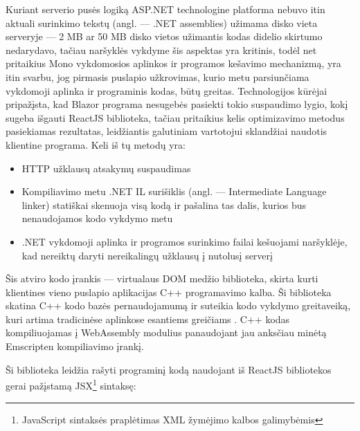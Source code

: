 \documentclass{VUMIFPSkursinis}
\begin{document}
Kuriant serverio pusės logiką ASP.NET technologine platforma nebuvo itin aktuali surinkimo tekstų (angl. — .NET assemblies) užimama disko vieta serveryje — 2 MB ar 50 MB disko vietos užimantis kodas didelio skirtumo nedarydavo, tačiau naršyklės vykdyme šis aspektas yra kritinis, todėl net pritaikius Mono vykdomosios aplinkos ir programos kešavimo mechanizmą, yra itin svarbu, jog pirmasis puslapio užkrovimas, kurio metu parsiunčiama vykdomoji aplinka ir programinis kodas, būtų greitas. Technologijos kūrėjai pripažįsta, kad Blazor programa nesugebės pasiekti tokio suspaudimo lygio, kokį sugeba išgauti ReactJS biblioteka, tačiau pritaikius kelis optimizavimo metodus pasiekiamas rezultatas, leidžiantis galutiniam vartotojui sklandžiai naudotis klientine programa. Keli iš tų metodų yra:
\begin{itemize}
    \item HTTP užklausų atsakymų suspaudimas
    \item Kompiliavimo metu .NET IL surišiklis (angl. — Intermediate Language linker) statiškai skenuoja visą kodą ir pašalina tas dalis, kurios bus nenaudojamos kodo vykdymo metu
    \item .NET vykdomoji aplinka ir programos surinkimo failai kešuojami naršyklėje, kad nereiktų daryti nereikalingų užklausų į nutolusį serverį
\end{itemize}

Šis atviro kodo įrankis — virtualaus DOM medžio biblioteka, skirta kurti klientines vieno puslapio aplikacijas C++ programavimo kalba. Ši biblioteka skatina C++ kodo bazės pernaudojamumą ir suteikia kodo vykdymo greitaveiką, kuri artima tradicinėse aplinkose esantiems greičiams \cite{ASM19}. C++ kodas kompiliuojamas į WebAssembly modulius panaudojant jau anksčiau minėtą Emscripten kompiliavimo įrankį.

Ši biblioteka leidžia rašyti programinį kodą naudojant iš ReactJS bibliotekos gerai pažįstamą JSX\footnote{JavaScript sintaksės praplėtimas XML žymėjimo kalbos galimybėmis} sintaksę:
\end{document}
